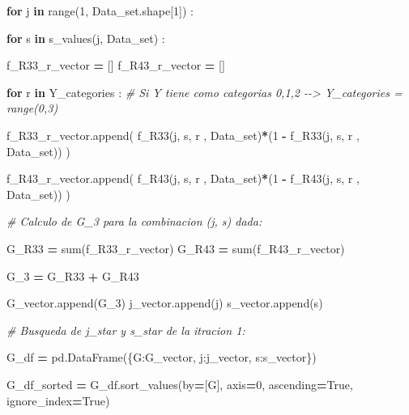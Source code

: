 \documentclass[
  11pt,
  a4paper,
]{article}
\newenvironment{Shaded}{\begin{snugshade}}{\end{snugshade}}
\newcommand{\BuiltInTok}[1]{#1}
\newcommand{\CommentTok}[1]{\textcolor[rgb]{0.56,0.35,0.01}{\textit{#1}}}
\newcommand{\ControlFlowTok}[1]{\textcolor[rgb]{0.13,0.29,0.53}{\textbf{#1}}}
\newcommand{\DecValTok}[1]{\textcolor[rgb]{0.00,0.00,0.81}{#1}}
\newcommand{\KeywordTok}[1]{\textcolor[rgb]{0.13,0.29,0.53}{\textbf{#1}}}
\newcommand{\NormalTok}[1]{#1}
\newcommand{\OperatorTok}[1]{\textcolor[rgb]{0.81,0.36,0.00}{\textbf{#1}}}
\newcommand{\StringTok}[1]{\textcolor[rgb]{0.31,0.60,0.02}{#1}}
\newcommand{\VariableTok}[1]{\textcolor[rgb]{0.00,0.00,0.00}{#1}}
\begin{document}
\begin{Shaded}
\begin{Highlighting}[]
        \ControlFlowTok{for}\NormalTok{ j }\KeywordTok{in} \BuiltInTok{range}\NormalTok{(}\DecValTok{1}\NormalTok{, Data\_set.shape[}\DecValTok{1}\NormalTok{]) :}

            \ControlFlowTok{for}\NormalTok{ s }\KeywordTok{in}\NormalTok{ s\_values(j, Data\_set) :}

 
\NormalTok{                f\_R33\_r\_vector }\OperatorTok{=}\NormalTok{ []}
\NormalTok{                f\_R43\_r\_vector }\OperatorTok{=}\NormalTok{ []}

                \ControlFlowTok{for}\NormalTok{ r }\KeywordTok{in}\NormalTok{ Y\_categories :  }\CommentTok{\# Si Y tiene como categorias 0,1,2 {-}{-}\textgreater{} Y\_categories = range(0,3)}

\NormalTok{                    f\_R33\_r\_vector.append( f\_R33(j, s, r , Data\_set)}\OperatorTok{*}\NormalTok{(}\DecValTok{1} \OperatorTok{{-}}\NormalTok{ f\_R33(j, s, r , Data\_set)) )}

\NormalTok{                    f\_R43\_r\_vector.append( f\_R43(j, s, r , Data\_set)}\OperatorTok{*}\NormalTok{(}\DecValTok{1} \OperatorTok{{-}}\NormalTok{ f\_R43(j, s, r , Data\_set)) )}
 

            \CommentTok{\# Calculo de G\_3 para la combinacion (j, s) dada:}

\NormalTok{                G\_R33 }\OperatorTok{=}  \BuiltInTok{sum}\NormalTok{(f\_R33\_r\_vector)}
\NormalTok{                G\_R43 }\OperatorTok{=}  \BuiltInTok{sum}\NormalTok{(f\_R43\_r\_vector)}

\NormalTok{                G\_3 }\OperatorTok{=}\NormalTok{  G\_R33 }\OperatorTok{+}\NormalTok{ G\_R43}

\NormalTok{                G\_vector.append(G\_3)}
\NormalTok{                j\_vector.append(j)}
\NormalTok{                s\_vector.append(s)}
 


        \CommentTok{\# Busqueda de j\_star y s\_star de la itracion 1:}

\NormalTok{        G\_df }\OperatorTok{=}\NormalTok{ pd.DataFrame(\{}\StringTok{\textquotesingle{}G\textquotesingle{}}\NormalTok{:G\_vector, }\StringTok{\textquotesingle{}j\textquotesingle{}}\NormalTok{:j\_vector, }\StringTok{\textquotesingle{}s\textquotesingle{}}\NormalTok{:s\_vector\})}

\NormalTok{        G\_df\_sorted }\OperatorTok{=}\NormalTok{ G\_df.sort\_values(by}\OperatorTok{=}\NormalTok{[}\StringTok{\textquotesingle{}G\textquotesingle{}}\NormalTok{], axis}\OperatorTok{=}\DecValTok{0}\NormalTok{, ascending}\OperatorTok{=}\VariableTok{True}\NormalTok{, ignore\_index}\OperatorTok{=}\VariableTok{True}\NormalTok{)}


\end{Highlighting}
\end{Shaded}
\end{document}
